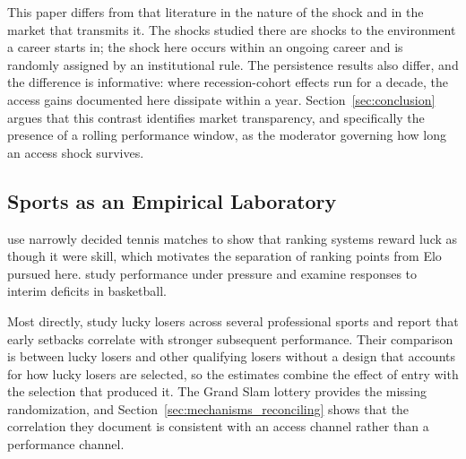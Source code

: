 This paper differs from that literature in the nature of the shock and in the market that transmits it. The shocks studied there are shocks to the environment a career starts in; the shock here occurs within an ongoing career and is randomly assigned by an institutional rule. The persistence results also differ, and the difference is informative: where recession-cohort effects run for a decade, the access gains documented here dissipate within a year. Section~\ref{sec:conclusion} argues that this contrast identifies market transparency, and specifically the presence of a rolling performance window, as the moderator governing how long an access shock survives.

\subsection{Sports as an Empirical Laboratory}
\label{sec:lit_sports}

\citet{Gauriot2019_fooled_randomness} use narrowly decided tennis matches to show that ranking systems reward luck as though it were skill, which motivates the separation of ranking points from Elo pursued here. \citet{GonzalezDiaz2012_performing_best} study performance under pressure and \citet{Berger2011_can_losing} examine responses to interim deficits in basketball.

Most directly, \citet{Maity2025_early_career_sports} study lucky losers across several professional sports and report that early setbacks correlate with stronger subsequent performance. Their comparison is between lucky losers and other qualifying losers without a design that accounts for how lucky losers are selected, so the estimates combine the effect of entry with the selection that produced it. The Grand Slam lottery provides the missing randomization, and Section~\ref{sec:mechanisms_reconciling} shows that the correlation they document is consistent with an access channel rather than a performance channel.
